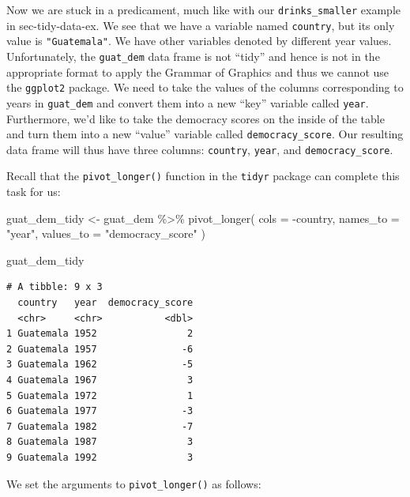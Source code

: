 \documentclass[
  letterpaper,
  DIV=11,
  numbers=noendperiod]{scrreprt}
\newenvironment{Shaded}{\begin{snugshade}}{\end{snugshade}}
\newcommand{\AttributeTok}[1]{\textcolor[rgb]{0.40,0.45,0.13}{#1}}
\newcommand{\FunctionTok}[1]{\textcolor[rgb]{0.28,0.35,0.67}{#1}}
\newcommand{\NormalTok}[1]{\textcolor[rgb]{0.00,0.23,0.31}{#1}}
\newcommand{\OtherTok}[1]{\textcolor[rgb]{0.00,0.23,0.31}{#1}}
\newcommand{\SpecialCharTok}[1]{\textcolor[rgb]{0.37,0.37,0.37}{#1}}
\newcommand{\StringTok}[1]{\textcolor[rgb]{0.13,0.47,0.30}{#1}}
\theoremstyle{definition}
\theoremstyle{remark}
\begin{document}
Now we are stuck in a predicament, much like with our
\texttt{drinks\_smaller} example in sec-tidy-data-ex. We see that we
have a variable named \texttt{country}, but its only value is
\texttt{"Guatemala"}. We have other variables denoted by different year
values. Unfortunately, the \texttt{guat\_dem} data frame is not ``tidy''
and hence is not in the appropriate format to apply the Grammar of
Graphics and thus we cannot use the \texttt{ggplot2} package. We need to
take the values of the columns corresponding to years in
\texttt{guat\_dem} and convert them into a new ``key'' variable called
\texttt{year}. Furthermore, we'd like to take the democracy scores on
the inside of the table and turn them into a new ``value'' variable
called \texttt{democracy\_score}. Our resulting data frame will thus
have three columns: \texttt{country}, \texttt{year}, and
\texttt{democracy\_score}.

Recall that the \texttt{pivot\_longer()} function in the \texttt{tidyr}
package can complete this task for us:

\begin{Shaded}
\begin{Highlighting}[]
\NormalTok{guat\_dem\_tidy }\OtherTok{\textless{}{-}}\NormalTok{ guat\_dem }\SpecialCharTok{\%\textgreater{}\%} 
  \FunctionTok{pivot\_longer}\NormalTok{(}
    \AttributeTok{cols =} \SpecialCharTok{{-}}\NormalTok{country, }
    \AttributeTok{names\_to =} \StringTok{"year"}\NormalTok{, }
    \AttributeTok{values\_to =} \StringTok{"democracy\_score"}
\NormalTok{  ) }

\NormalTok{guat\_dem\_tidy}
\end{Highlighting}
\end{Shaded}

\begin{verbatim}
# A tibble: 9 x 3
  country   year  democracy_score
  <chr>     <chr>           <dbl>
1 Guatemala 1952                2
2 Guatemala 1957               -6
3 Guatemala 1962               -5
4 Guatemala 1967                3
5 Guatemala 1972                1
6 Guatemala 1977               -3
7 Guatemala 1982               -7
8 Guatemala 1987                3
9 Guatemala 1992                3
\end{verbatim}

We set the arguments to \texttt{pivot\_longer()} as follows:
\end{document}

